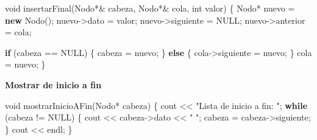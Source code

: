 \documentclass[
  11pt,
  a4paper,
  DIV=11,
  numbers=noendperiod]{scrreprt}
\newenvironment{Shaded}{\begin{snugshade}}{\end{snugshade}}
\newcommand{\ControlFlowTok}[1]{\textcolor[rgb]{0.00,0.23,0.31}{\textbf{#1}}}
\newcommand{\DataTypeTok}[1]{\textcolor[rgb]{0.68,0.00,0.00}{#1}}
\newcommand{\KeywordTok}[1]{\textcolor[rgb]{0.00,0.23,0.31}{\textbf{#1}}}
\newcommand{\NormalTok}[1]{\textcolor[rgb]{0.00,0.23,0.31}{#1}}
\newcommand{\OperatorTok}[1]{\textcolor[rgb]{0.37,0.37,0.37}{#1}}
\newcommand{\StringTok}[1]{\textcolor[rgb]{0.13,0.47,0.30}{#1}}
\begin{document}
\begin{Shaded}
\begin{Highlighting}[]
\DataTypeTok{void}\NormalTok{ insertarFinal}\OperatorTok{(}\NormalTok{Nodo}\OperatorTok{*\&}\NormalTok{ cabeza}\OperatorTok{,}\NormalTok{ Nodo}\OperatorTok{*\&}\NormalTok{ cola}\OperatorTok{,} \DataTypeTok{int}\NormalTok{ valor}\OperatorTok{)} \OperatorTok{\{}
\NormalTok{    Nodo}\OperatorTok{*}\NormalTok{ nuevo }\OperatorTok{=} \KeywordTok{new}\NormalTok{ Nodo}\OperatorTok{();}
\NormalTok{    nuevo}\OperatorTok{{-}\textgreater{}}\NormalTok{dato }\OperatorTok{=}\NormalTok{ valor}\OperatorTok{;}
\NormalTok{    nuevo}\OperatorTok{{-}\textgreater{}}\NormalTok{siguiente }\OperatorTok{=}\NormalTok{ NULL}\OperatorTok{;}
\NormalTok{    nuevo}\OperatorTok{{-}\textgreater{}}\NormalTok{anterior }\OperatorTok{=}\NormalTok{ cola}\OperatorTok{;}

    \ControlFlowTok{if} \OperatorTok{(}\NormalTok{cabeza }\OperatorTok{==}\NormalTok{ NULL}\OperatorTok{)} \OperatorTok{\{}
\NormalTok{        cabeza }\OperatorTok{=}\NormalTok{ nuevo}\OperatorTok{;}
    \OperatorTok{\}} \ControlFlowTok{else} \OperatorTok{\{}
\NormalTok{        cola}\OperatorTok{{-}\textgreater{}}\NormalTok{siguiente }\OperatorTok{=}\NormalTok{ nuevo}\OperatorTok{;}
    \OperatorTok{\}}
\NormalTok{    cola }\OperatorTok{=}\NormalTok{ nuevo}\OperatorTok{;}
\OperatorTok{\}}
\end{Highlighting}
\end{Shaded}

\textbf{Mostrar de inicio a fin}

\begin{Shaded}
\begin{Highlighting}[]
\DataTypeTok{void}\NormalTok{ mostrarInicioAFin}\OperatorTok{(}\NormalTok{Nodo}\OperatorTok{*}\NormalTok{ cabeza}\OperatorTok{)} \OperatorTok{\{}
\NormalTok{    cout }\OperatorTok{\textless{}\textless{}} \StringTok{"Lista de inicio a fin: "}\OperatorTok{;}
    \ControlFlowTok{while} \OperatorTok{(}\NormalTok{cabeza }\OperatorTok{!=}\NormalTok{ NULL}\OperatorTok{)} \OperatorTok{\{}
\NormalTok{        cout }\OperatorTok{\textless{}\textless{}}\NormalTok{ cabeza}\OperatorTok{{-}\textgreater{}}\NormalTok{dato }\OperatorTok{\textless{}\textless{}} \StringTok{" "}\OperatorTok{;}
\NormalTok{        cabeza }\OperatorTok{=}\NormalTok{ cabeza}\OperatorTok{{-}\textgreater{}}\NormalTok{siguiente}\OperatorTok{;}
    \OperatorTok{\}}
\NormalTok{    cout }\OperatorTok{\textless{}\textless{}}\NormalTok{ endl}\OperatorTok{;}
\OperatorTok{\}}
\end{Highlighting}
\end{Shaded}
\end{document}

